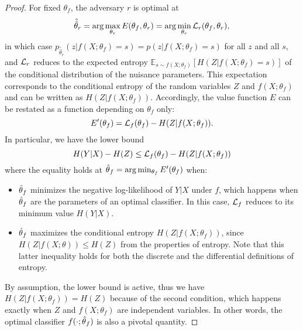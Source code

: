 \documentclass{article}
\theoremstyle{plain}
\begin{document}
\begin{proof}

For fixed $\theta_f$, the adversary $r$ is optimal at
\begin{equation}
    \hat{\hat\theta}_r = \arg \max_{\theta_r} E(\theta_f, \theta_r)  = \arg \min_{\theta_r} {\cal L}_r(\theta_f, \theta_r),
\end{equation}
in which case $p_{\hat{\hat\theta}_r}(z|f(X;\theta_f)=s) =
p(z|f(X;\theta_f)=s)$ for all $z$ and all $s$, and ${\cal L}_r$ reduces to the expected entropy
$\mathbb{E}_{s \sim f(X;\theta_f)} [ H({Z|f(X;\theta_f)=s}) ]$ of the conditional distribution of the nuisance parameters.
This expectation corresponds to the conditional entropy of the random variables
$Z$ and $f(X;\theta_f)$ and can be written as $H(Z|f(X;\theta_f))$.
Accordingly, the
value function $E$ can be restated as a function depending on $\theta_f$ only:
\begin{equation}
    E'(\theta_f) = {\cal L}_f(\theta_f) -  H({Z|f(X;\theta_f)}).
\end{equation}
In particular, we have the lower bound
\begin{equation}
    H({Y|X}) - H(Z) \leq {\cal L}_f(\theta_f) - H({Z|f(X;\theta_f)})
\end{equation}
where the equality holds at $\smash{\hat\theta}_f = \arg \min_{\theta_f}
E'(\theta_f)$  when:
\begin{itemize}
    \item $\smash{\hat\theta}_f$ minimizes the negative log-likelihood of $Y|X$ under $f$,
    which happens when $\smash{\hat\theta}_f$ are the parameters
    of an optimal classifier. In this case, ${\cal L}_f$ reduces to its
    minimum value $H({Y|X})$.

    \item $\smash{\hat\theta}_f$ maximizes the conditional entropy
    $H({Z|f(X;\theta_f)})$, since $H(Z|f(X;\theta)) \leq H(Z)$ from the properties of entropy. Note that this
    latter inequality holds for both the discrete and the differential definitions of entropy.
\end{itemize}
By assumption, the lower bound is active, thus we have $H(Z|f(X;\theta_f)) = H(Z)$
because of the second condition, which happens exactly when $Z$ and $f(X;\theta_f)$
are independent variables. In other words,  the
optimal classifier $f(\cdot;\smash{\hat\theta}_f)$ is also a pivotal
quantity.
\end{proof}
\end{document}
